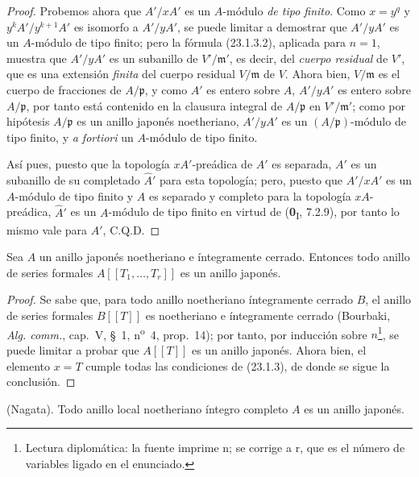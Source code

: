 \begin{proof}
Probemos ahora que $A'/xA'$ es un $A$-módulo \emph{de tipo finito}. Como $x=y^q$
y $y^kA'/y^{k+1}A'$ es isomorfo a $A'/yA'$, se puede limitar a
demostrar que $A'/yA'$ es un $A$-módulo de tipo finito; pero la fórmula
(23.1.3.2), aplicada para $n=1$, muestra que $A'/yA'$ es un subanillo de
$V'/\mathfrak m'$, es decir, del \emph{cuerpo residual} de $V'$, que es una
extensión \emph{finita} del cuerpo residual $V/\mathfrak m$ de $V$. Ahora bien,
$V/\mathfrak m$ es el cuerpo de fracciones de $A/\mathfrak p$, y como
$A'$ es entero sobre $A$, $A'/yA'$ es entero sobre $A/\mathfrak p$, por tanto
está contenido en la clausura integral de $A/\mathfrak p$ en
$V'/\mathfrak m'$; como por hipótesis $A/\mathfrak p$ es un anillo
japonés noetheriano, $A'/yA'$ es un $(A/\mathfrak p)$-módulo de tipo finito,
y \emph{a fortiori} un $A$-módulo de tipo finito.

Así pues, puesto que la topología $xA'$-preádica de $A'$ es separada, $A'$ es un
subanillo de su completado $\widehat{A}'$ para esta topología; pero, puesto que
$A'/xA'$ es un $A$-módulo de tipo finito y $A$ es separado y completo para
la topología $xA$-preádica, $\widehat{A}'$ es un $A$-módulo de tipo finito en
virtud de (\textbf{0}\textsubscript{I}, 7.2.9), por tanto lo mismo vale para $A'$, C.Q.D.
\end{proof}

\begin{corollary}[23.1.4]
\label{0.23.1.4-fr}
Sea $A$ un anillo japonés noetheriano e íntegramente cerrado. Entonces todo
anillo de series formales $A[[T_1,\ldots,T_r]]$ es un anillo japonés.
\end{corollary}

\begin{proof}
Se sabe que, para todo anillo noetheriano íntegramente cerrado $B$, el anillo de
series formales $B[[T]]$ es noetheriano e íntegramente cerrado (Bourbaki,
\emph{Alg. comm.}, cap.~V, §~1, n\textsuperscript{o}~4, prop.~14); por
tanto, por inducción sobre $n$\footnote{Lectura diplomática: la fuente imprime n; se corrige a r, que es el número de variables ligado en el enunciado.}, se puede limitar a probar que $A[[T]]$ es un anillo
japonés. Ahora bien, el elemento $x=T$ cumple todas las condiciones de (23.1.3), de donde
se sigue la conclusión.
\end{proof}

\begin{theorem}[23.1.5]
\label{0.23.1.5-fr}
\textnormal{(Nagata).} Todo anillo local noetheriano íntegro \textup{completo} $A$ es
un anillo japonés.
\end{theorem}

